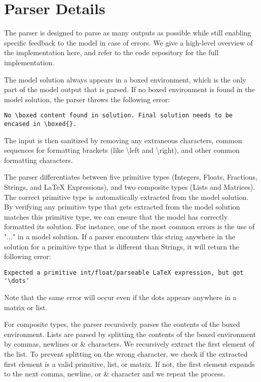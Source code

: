 \section{Parser Details}\label{app:parser}
The parser is designed to parse as many outputs as possible while still enabling specific feedback to the model in case of errors. We give a high-level overview of the implementation here, and refer to the code repository for the full implementation.

The model solution always appears in a boxed environment, which is the only part of the model output that is parsed. If no boxed environment is found in the model solution, the parser throws the following error:
\begin{verbatim}
No \boxed content found in solution. Final solution needs to be encased in \boxed{}.
\end{verbatim}
The input is then sanitized by removing any extraneous characters, common sequences for formatting brackets (like \textbackslash left and \textbackslash right), and other common formatting characters.  

The parser differentiates between five primitive types (Integers, Floats, Fractions, Strings, and LaTeX Expressions), and two composite types (Lists and Matrices). The correct primitive type is automatically extracted from the model solution. By verifying any primitive type that gets extracted from the model solution matches this primitive type, we can ensure that the model has correctly formatted its solution. For instance, one of the most common errors is the use of "$\dots$" in a model solution. If a parser encounters this string anywhere in the solution for a primitive type that is different than Strings, it will return the following error:
\begin{verbatim}
Expected a primitive int/float/parseable LaTeX expression, but got '\dots'
\end{verbatim}
Note that the same error will occur even if the dots appears anywhere in a matrix or list.

For composite types, the parser recursively parses the contents of the boxed environment. Lists are parsed by splitting the contents of the boxed environment by commas, newlines or \& characters. We recursively extract the first element of the list. To prevent splitting on the wrong character, we check if the extracted first element is a valid primitive, list, or matrix. If not, the first element expands to the next comma, newline, or \& character and we repeat the process. 


